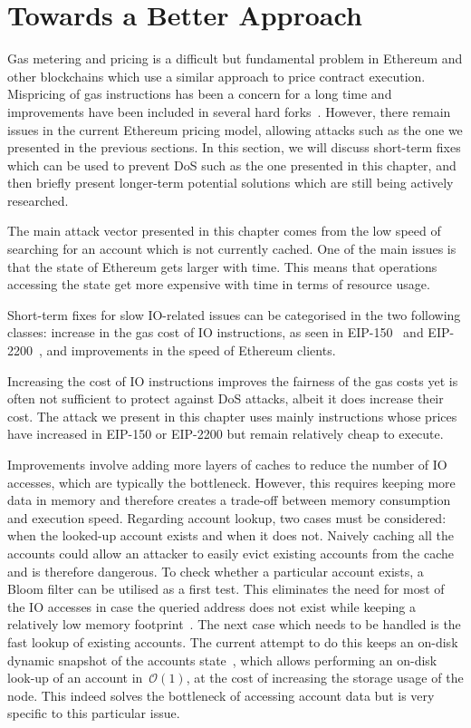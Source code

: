 \section{Towards a Better Approach}
\label{sec:3:design}

Gas metering and pricing is a difficult but fundamental problem in Ethereum and other blockchains which use a similar approach to price contract execution. Mispricing of gas instructions has been a concern for a long time and improvements have been included in several hard forks~\cite{erc150,eip2200}. However, there remain issues in the current Ethereum pricing model, allowing attacks such as the one we presented in the previous sections. In this section, we will discuss short-term fixes which can be used to prevent DoS such as the one presented in this chapter, and then briefly present longer-term potential solutions which are still being actively researched.

The main attack vector presented in this chapter comes from the low speed of searching for an account which is not currently cached. One of the main issues is that the state of Ethereum gets larger with time. This means that operations accessing the state get more expensive with time in terms of resource usage.

Short-term fixes for slow IO-related issues can be categorised in the two following classes: increase in the gas cost of IO instructions, as seen in EIP-150~\cite{erc150} and EIP-2200~\cite{eip2200}, and improvements in the speed of Ethereum clients.

Increasing the cost of IO instructions improves the fairness of the gas costs yet is often not sufficient to protect against DoS attacks, albeit it does increase their cost. The attack we present in this chapter uses mainly instructions whose prices have increased in EIP-150 or EIP-2200 but remain relatively cheap to execute.

Improvements involve adding more layers of caches to reduce the number of IO accesses, which are typically the bottleneck. However, this requires keeping more data in memory and therefore creates a trade-off between memory consumption and execution speed. Regarding account lookup, two cases must be considered: when the looked-up account exists and when it does not. Naively caching all the accounts could allow an attacker to easily evict existing accounts from the cache and is therefore dangerous. To check whether a particular account exists, a Bloom filter can be utilised as a first test. This eliminates the need for most of the IO accesses in case the queried address does not exist while keeping a relatively low memory footprint~\cite{mitzenmacher2002compressed}. The next case which needs to be handled is the fast lookup of existing accounts. The current attempt to do this keeps an on-disk dynamic snapshot of the accounts state~\cite{dynamic-trie-snapshot-pr}, which allows performing an on-disk look-up of an account in~$\mathcal{O}(1)$, at the cost of increasing the storage usage of the node. This indeed solves the bottleneck of accessing account data but is very specific to this particular issue.

